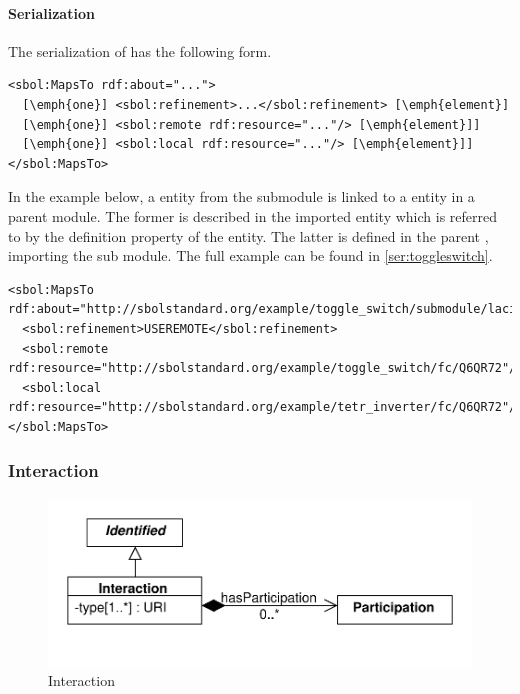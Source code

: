 
\paragraph{Serialization}
The serialization of  has the following form.
\begin{lstlisting}
<sbol:MapsTo rdf:about="...">
  [\emph{one}] <sbol:refinement>...</sbol:refinement> [\emph{element}]
  [\emph{one}] <sbol:remote rdf:resource="..."/> [\emph{element}]]
  [\emph{one}] <sbol:local rdf:resource="..."/> [\emph{element}]]
</sbol:MapsTo>
\end{lstlisting}

In the example below, a  entity from the submodule is linked to a  entity in a parent module. The former is described in the imported  entity which is referred to by the definition property of the  entity. The latter is defined in the parent , importing the sub module. The full example can be found in \ref{ser:toggleswitch}.
\begin{lstlisting}
<sbol:MapsTo rdf:about="http://sbolstandard.org/example/toggle_switch/submodule/laci_inverter/mapping/Q6QR72">
  <sbol:refinement>USEREMOTE</sbol:refinement>
  <sbol:remote rdf:resource="http://sbolstandard.org/example/toggle_switch/fc/Q6QR72"/>
  <sbol:local rdf:resource="http://sbolstandard.org/example/tetr_inverter/fc/Q6QR72"/>
</sbol:MapsTo>
\end{lstlisting}



\subsubsection{Interaction}
\label{sec:Interaction}

\begin{figure}[ht]
\begin{center}
\includegraphics[scale=0.6]{uml/interaction}
\caption[]{Interaction}
\label{uml:interaction}
\end{center}
\end{figure}

